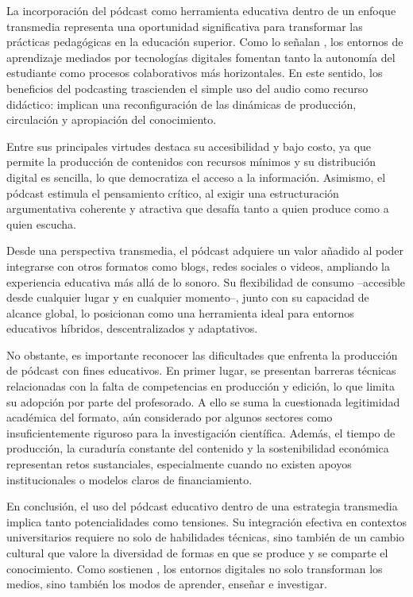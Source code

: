 \documentclass[
  spanish,
  11pt,
  a4paper,
]{scrbook}
\begin{document}
\endgroup

La incorporación del pódcast como herramienta educativa dentro de un
enfoque transmedia representa una oportunidad significativa para
transformar las prácticas pedagógicas en la educación superior. Como lo
señalan \textcite{McLoughlin2010}, los entornos de aprendizaje mediados
por tecnologías digitales fomentan tanto la autonomía del estudiante
como procesos colaborativos más horizontales. En este sentido, los
beneficios del podcasting trascienden el simple uso del audio como
recurso didáctico: implican una reconfiguración de las dinámicas de
producción, circulación y apropiación del conocimiento.

Entre sus principales virtudes destaca su accesibilidad y bajo costo, ya
que permite la producción de contenidos con recursos mínimos y su
distribución digital es sencilla, lo que democratiza el acceso a la
información. Asimismo, el pódcast estimula el pensamiento crítico, al
exigir una estructuración argumentativa coherente y atractiva que
desafía tanto a quien produce como a quien escucha.

Desde una perspectiva transmedia, el pódcast adquiere un valor añadido
al poder integrarse con otros formatos como blogs, redes sociales o
videos, ampliando la experiencia educativa más allá de lo sonoro. Su
flexibilidad de consumo --accesible desde cualquier lugar y en cualquier
momento--, junto con su capacidad de alcance global, lo posicionan como
una herramienta ideal para entornos educativos híbridos,
descentralizados y adaptativos.

No obstante, es importante reconocer las dificultades que enfrenta la
producción de pódcast con fines educativos. En primer lugar, se
presentan barreras técnicas relacionadas con la falta de competencias en
producción y edición, lo que limita su adopción por parte del
profesorado. A ello se suma la cuestionada legitimidad académica del
formato, aún considerado por algunos sectores como insuficientemente
riguroso para la investigación científica. Además, el tiempo de
producción, la curaduría constante del contenido y la sostenibilidad
económica representan retos sustanciales, especialmente cuando no
existen apoyos institucionales o modelos claros de financiamiento.

En conclusión, el uso del pódcast educativo dentro de una estrategia
transmedia implica tanto potencialidades como tensiones. Su integración
efectiva en contextos universitarios requiere no solo de habilidades
técnicas, sino también de un cambio cultural que valore la diversidad de
formas en que se produce y se comparte el conocimiento. Como sostienen
\textcite{McLoughlin2010}, los entornos digitales no solo transforman
los medios, sino también los modos de aprender, enseñar e investigar.
\end{document}
